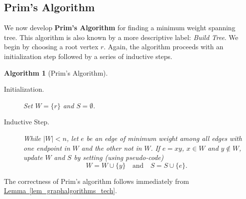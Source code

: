 \documentclass[10pt,]{book}
\newcommand{\terminology}[1]{\textbf{#1}}
\theoremstyle{plain}
\newtheorem{algorithm}[theorem]{Algorithm}
\theoremstyle{definition}
\theoremstyle{definition}
\theoremstyle{definition}
\theoremstyle{definition}
\numberwithin{equation}{section}
\newcommand{\lt}{<}
\begin{document}
\subsection[{Prim's Algorithm}]{Prim's Algorithm}\label{alg_prim}
\hypertarget{p-185}{}%
We now develop \terminology{Prim's Algorithm} for finding a minimum weight spanning tree. This algorithm is also known by a more descriptive label: \emph{Build Tree}. We begin by choosing a root vertex \(r\). Again, the algorithm proceeds with an initialization step followed by a series of inductive steps.%
\begin{algorithm}[{Prim's Algorithm}]\label{algorithm-2}
\hypertarget{p-186}{}%
\leavevmode%
\begin{description}
\item[{Initialization.}]\hypertarget{li-45}{}\hypertarget{p-187}{}%
Set \(W=\{r\}\) and \(S=\emptyset\).%
\item[{Inductive Step.}]\hypertarget{li-46}{}\hypertarget{p-188}{}%
While \(|W| \lt n\), let \(e\) be an edge of minimum weight among all edges with one endpoint in \(W\) and the other not in \(W\).  If \(e=xy\), \(x\in W\) and \(y\not\in W\), update \(W\) and \(S\) by setting (using pseudo-code)%
\begin{equation*}
W = W\cup\{y\}\quad\text{and} \quad S = S\cup\{e\}.
\end{equation*}
%
\end{description}
%
\end{algorithm}
\hypertarget{p-189}{}%
The correctness of Prim's algorithm follows immediately from \hyperref[lem_graphalgorithms_tech]{Lemma~\ref{lem_graphalgorithms_tech}}.%
\end{document}
